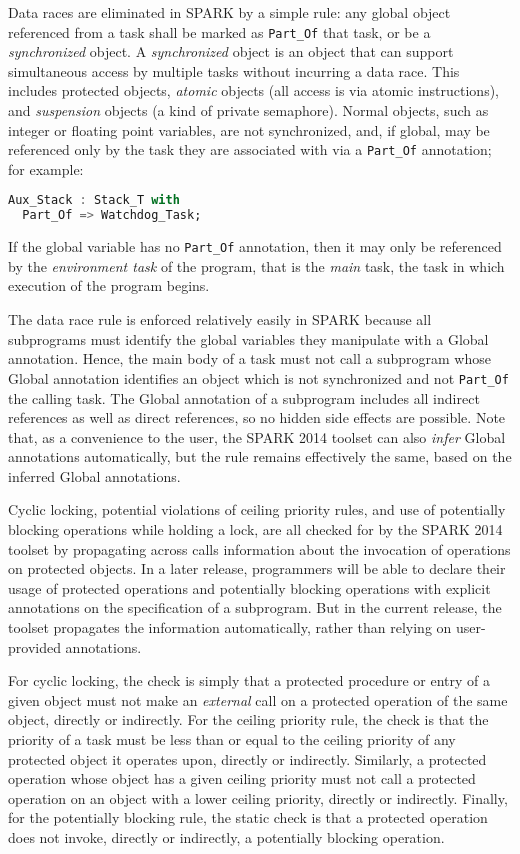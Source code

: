 \documentclass[conference,compsoc]{IEEEtran}
\begin{document}
Data races are eliminated in SPARK by a simple rule: any global object
referenced from a task shall be marked as \verb|Part_Of| that task, or be a
\emph{synchronized} object. A \emph{synchronized} object is an object that
can support simultaneous access by multiple tasks without incurring a data
race. This includes protected objects, \emph{atomic} objects (all access is
via atomic instructions), and \emph{suspension} objects (a kind of private
semaphore). Normal objects, such as integer or floating point variables,
are not synchronized, and, if global, may be referenced only by the task
they are associated with via a \verb|Part_Of| annotation; for example:
\begin{lstlisting}[language=Ada,basicstyle=\tt]
Aux_Stack : Stack_T with
  Part_Of => Watchdog_Task;
\end{lstlisting}
If the global variable has no \verb|Part_Of| annotation, then it may only
be referenced by the \emph{environment task} of the program, that is the
\emph{main} task, the task in which execution of the program begins.

The data race rule is enforced relatively easily in SPARK because all
subprograms must identify the global variables they manipulate with a
Global annotation. Hence, the main body of a task must not call a
subprogram whose Global annotation identifies an object which is not
synchronized and not \verb|Part_Of| the calling task. The Global annotation
of a subprogram includes all indirect references as well as direct
references, so no hidden side effects are possible. Note that, as a
convenience to the user, the SPARK 2014 toolset can also \emph{infer}
Global annotations automatically, but the rule remains effectively the
same, based on the inferred Global annotations.

Cyclic locking, potential violations of ceiling priority rules, and use of
potentially blocking operations while holding a lock, are all checked for
by the SPARK 2014 toolset by propagating across calls information about the
invocation of operations on protected objects. In a later release,
programmers will be able to declare their usage of protected operations and
potentially blocking operations with explicit annotations on the
specification of a subprogram. But in the current release, the toolset
propagates the information automatically, rather than relying on
user-provided annotations.

For cyclic locking, the check is simply that a protected procedure or entry
of a given object must not make an \emph{external} call on a protected
operation of the same object, directly or indirectly. For the ceiling
priority rule, the check is that the priority of a task must be less than
or equal to the ceiling priority of any protected object it operates upon,
directly or indirectly. Similarly, a protected operation whose object has a
given ceiling priority must not call a protected operation on an object
with a lower ceiling priority, directly or indirectly. Finally, for the
potentially blocking rule, the static check is that a protected operation
does not invoke, directly or indirectly, a potentially blocking operation.
\end{document}
